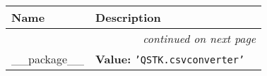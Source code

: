     \vspace{-1cm}
\hspace{\varindent}\begin{longtable}{|p{\varnamewidth}|p{\vardescrwidth}|l}
\cline{1-2}
\cline{1-2} \centering \textbf{Name} & \centering \textbf{Description}& \\
\cline{1-2}
\endhead\cline{1-2}\multicolumn{3}{r}{\small\textit{continued on next page}}\\\endfoot\cline{1-2}
\endlastfoot\raggedright \_\-\_\-p\-a\-c\-k\-a\-g\-e\-\_\-\_\- & \raggedright \textbf{Value:} 
{\tt \texttt{'}\texttt{QSTK.csvconverter}\texttt{'}}&\\
\cline{1-2}
\end{longtable}

